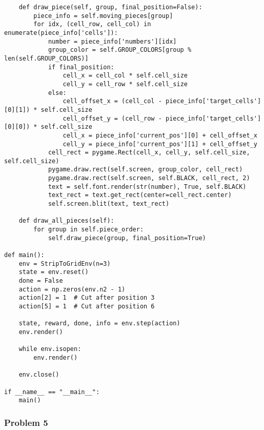\begin{lstlisting}
    def draw_piece(self, group, final_position=False):
        piece_info = self.moving_pieces[group]
        for idx, (cell_row, cell_col) in enumerate(piece_info['cells']):
            number = piece_info['numbers'][idx]
            group_color = self.GROUP_COLORS[group % len(self.GROUP_COLORS)]
            if final_position:
                cell_x = cell_col * self.cell_size
                cell_y = cell_row * self.cell_size
            else:
                cell_offset_x = (cell_col - piece_info['target_cells'][0][1]) * self.cell_size
                cell_offset_y = (cell_row - piece_info['target_cells'][0][0]) * self.cell_size
                cell_x = piece_info['current_pos'][0] + cell_offset_x
                cell_y = piece_info['current_pos'][1] + cell_offset_y
            cell_rect = pygame.Rect(cell_x, cell_y, self.cell_size, self.cell_size)
            pygame.draw.rect(self.screen, group_color, cell_rect)
            pygame.draw.rect(self.screen, self.BLACK, cell_rect, 2)
            text = self.font.render(str(number), True, self.BLACK)
            text_rect = text.get_rect(center=cell_rect.center)
            self.screen.blit(text, text_rect)

    def draw_all_pieces(self):
        for group in self.piece_order:
            self.draw_piece(group, final_position=True)

def main():
    env = StripToGridEnv(n=3)
    state = env.reset()
    done = False
    action = np.zeros(env.n2 - 1)
    action[2] = 1  # Cut after position 3
    action[5] = 1  # Cut after position 6

    state, reward, done, info = env.step(action)
    env.render()

    while env.isopen:
        env.render()

    env.close()

if __name__ == "__main__":
    main()
\end{lstlisting}




\newpage
\clearpage

\subsubsection*{Problem 5}
\label{appendix:G_2023_IMO_Shortlist_C5}


